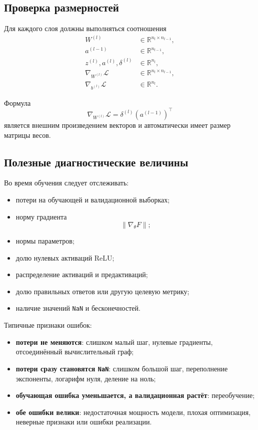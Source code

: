 \documentclass[12pt,a4paper]{article}
\theoremstyle{plain}
\theoremstyle{definition}
\theoremstyle{remark}
\newcommand{\R}{\mathbb{R}}
\newcommand{\norm}[1]{\left\lVert #1 \right\rVert}
\begin{document}
\subsection{Проверка размерностей}

Для каждого слоя должны выполняться соотношения
\[
\begin{aligned}
    W^{(l)}
    &\in\R^{n_l\times n_{l-1}},\\
    a^{(l-1)}
    &\in\R^{n_{l-1}},\\
    z^{(l)},a^{(l)},\delta^{(l)}
    &\in\R^{n_l},\\
    \nabla_{W^{(l)}}\mathcal{L}
    &\in\R^{n_l\times n_{l-1}},\\
    \nabla_{b^{(l)}}\mathcal{L}
    &\in\R^{n_l}.
\end{aligned}
\]

Формула
\[
    \nabla_{W^{(l)}}\mathcal{L}
    =
    \delta^{(l)}(a^{(l-1)})^\top
\]
является внешним произведением векторов и автоматически имеет
размер матрицы весов.

\subsection{Полезные диагностические величины}

Во время обучения следует отслеживать:

\begin{itemize}
    \item потери на обучающей и валидационной выборках;
    \item норму градиента
    \[
        \norm{\nabla_\theta F};
    \]
    \item нормы параметров;
    \item долю нулевых активаций ReLU;
    \item распределение активаций и предактиваций;
    \item долю правильных ответов или другую целевую метрику;
    \item наличие значений \texttt{NaN} и бесконечностей.
\end{itemize}

Типичные признаки ошибок:

\begin{itemize}
    \item \textbf{потери не меняются}: слишком малый шаг, нулевые
    градиенты, отсоединённый вычислительный граф;

    \item \textbf{потери сразу становятся \texttt{NaN}}:
    слишком большой шаг, переполнение экспоненты, логарифм нуля,
    деление на ноль;

    \item \textbf{обучающая ошибка уменьшается, а валидационная
    растёт}: переобучение;

    \item \textbf{обе ошибки велики}: недостаточная мощность модели,
    плохая оптимизация, неверные признаки или ошибки реализации.
\end{itemize}
\end{document}
